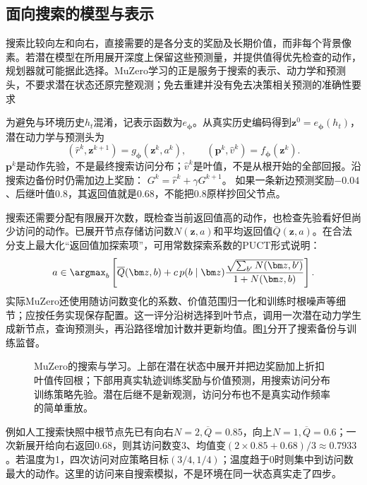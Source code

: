 \subsection{面向搜索的模型与表示}
\label{sec:rl-learning-muzero}

搜索比较向左和向右，直接需要的是各分支的奖励及长期价值，而非每个背景像素。若潜在模型在所用展开深度上保留这些预测量，并提供值得优先检查的动作，规划器就可能据此选择。MuZero学习的正是服务于搜索的表示、动力学和预测头，不要求潜在状态还原完整观测；免去重建并没有免去决策相关预测的准确性要求

为避免与环境历史$h_t$混淆，记表示函数为$e_{\bm\phi}$。从真实历史编码得到$\bm z^0=e_{\bm\phi}(h_t)$，潜在动力学与预测头为
\begin{equation}
  (\widehat r^k,\bm z^{k+1})=g_{\bm\phi}(\bm z^k,a^k),
  \qquad
  (\bm p^k,\widehat v^k)=f_{\bm\phi}(\bm z^k).
  \label{eq:rl-learning-muzero-model}
\end{equation}
$\bm p^k$是动作先验，不是最终搜索访问分布；$\widehat v^k$是叶值，不是从根开始的全部回报。沿搜索边备份时仍需加边上奖励：
$G^k=\widehat r^k+\gamma G^{k+1}$。
如果一条新边预测奖励$-0.04$、后继叶值$0.8$，其返回值就是$0.68$，不能把$0.8$原样抄回父节点。

搜索还需要分配有限展开次数，既检查当前返回值高的动作，也检查先验看好但尚少访问的动作。已展开节点存储访问数$N(\bm z,a)$和平均返回值$\overline Q(\bm z,a)$。在合法分支上最大化“返回值加探索项”，可用常数探索系数的PUCT形式说明：
\[
  a\in\argmax_b\left[
    \overline Q(\bm z,b)
    +c\,p(b\mid\bm z)
      \frac{\sqrt{\sum_{b'}N(\bm z,b')}}{1+N(\bm z,b)}
  \right].
\]
实际MuZero还使用随访问数变化的系数、价值范围归一化和训练时根噪声等细节；应按任务实现保存配置。这一评分沿树选择到叶节点，调用一次潜在动力学生成新节点，查询预测头，再沿路径增加计数并更新均值。图\ref{fig:rl-learning-muzero}分开了搜索备份与训练监督。

\begin{figure}[t]
  \centering
  
  \caption{MuZero的搜索与学习。上部在潜在状态中展开并把边奖励加上折扣叶值传回根；下部用真实轨迹训练奖励与价值预测，用搜索访问分布训练策略先验。潜在后继不是新观测，访问分布也不是真实动作频率的简单重放。}
  \label{fig:rl-learning-muzero}
\end{figure}

例如人工搜索快照中根节点先已有向右$N=2,\overline Q=0.85$，向上$N=1,\overline Q=0.6$；一次新展开给向右返回$0.68$，则其访问数变3、均值变$(2\times0.85+0.68)/3\approx0.7933$。若温度为1，四次访问对应策略目标$(3/4,1/4)$；温度趋于0时则集中到访问数最大的动作。这里的访问来自搜索模拟，不是环境在同一状态真实走了四步。


